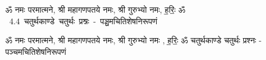 \documentclass[17pt]{extarticle}
\begin{document}
\begin{titlepage}
    \begin{center}
 
\begin{sanskrit}
    { \Large
    ॐ नमः परमात्मने, श्री महागणपतये नमः, 
श्री गुरुभ्यो नमः, ह॒रिः॒ ॐ 
    }
    \\
    \vspace{2.5cm}
    \mbox{ \Huge
    4.4      चतुर्थकाण्डे चतुर्थः प्रश्नः - पञ्चमचितिशेषनिरूपणं   }
\end{sanskrit}
\end{center}

\end{titlepage}
\tableofcontents

ॐ नमः परमात्मने, श्री महागणपतये नमः, 
श्री गुरुभ्यो नमः , ह॒रिः॒ ॐ       चतुर्थकाण्डे चतुर्थः प्रश्नः - पञ्चमचितिशेषनिरूपणं \newline

\end{document}
